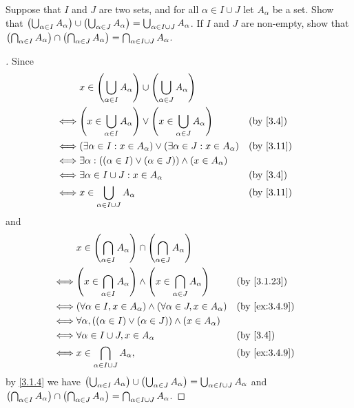 \begin{ex}\label{ex:3.4.10}
  Suppose that \(I\) and \(J\) are two sets, and for all \(\alpha \in I \cup J\) let \(A_\alpha\) be a set.
  Show that \(\left\lparen\bigcup_{\alpha \in I} A_\alpha\right\rparen \cup \left\lparen\bigcup_{\alpha \in J} A_\alpha\right\rparen = \bigcup_{\alpha \in I \cup J} A_\alpha\).
  If \(I\) and \(J\) are non-empty, show that \(\left\lparen\bigcap_{\alpha \in I} A_\alpha\right\rparen \cap \left\lparen\bigcap_{\alpha \in J} A_\alpha\right\rparen = \bigcap_{\alpha \in I \cup J} A_\alpha\).
\end{ex}

\begin{proof}[]
  Since
  \begin{align*}
         & x \in \pa{\bigcup_{\alpha \in I} A_\alpha} \cup \pa{\bigcup_{\alpha \in J} A_\alpha}                      \\
    \iff & \pa{x \in \bigcup_{\alpha \in I} A_\alpha} \lor \pa{x \in \bigcup_{\alpha \in J} A_\alpha} &  & \by{3.4}  \\
    \iff & (\exists \alpha \in I : x \in A_\alpha) \lor (\exists \alpha \in J : x \in A_\alpha)       &  & \by{3.11} \\
    \iff & \exists \alpha : ((\alpha \in I) \lor (\alpha \in J)) \land (x \in A_\alpha)                              \\
    \iff & \exists \alpha \in I \cup J : x \in A_\alpha                                               &  & \by{3.4}  \\
    \iff & x \in \bigcup_{\alpha \in I \cup J} A_\alpha                                               &  & \by{3.11}
  \end{align*}
  and
  \begin{align*}
         & x \in \pa{\bigcap_{\alpha \in I} A_\alpha} \cap \pa{\bigcap_{\alpha \in J} A_\alpha}                           \\
    \iff & \pa{x \in \bigcap_{\alpha \in I} A_\alpha} \land \pa{x \in \bigcap_{\alpha \in J} A_\alpha} &  & \by{3.1.23}   \\
    \iff & (\forall \alpha \in I, x \in A_\alpha) \land (\forall \alpha \in J, x \in A_\alpha)         &  & \by{ex:3.4.9} \\
    \iff & \forall \alpha, ((\alpha \in I) \lor (\alpha \in J)) \land (x \in A_\alpha)                                    \\
    \iff & \forall \alpha \in I \cup J, x \in A_\alpha                                                 &  & \by{3.4}      \\
    \iff & x \in \bigcap_{\alpha \in I \cup J} A_\alpha,                                               &  & \by{ex:3.4.9}
  \end{align*}
  by \cref{3.1.4} we have \(\left\lparen\bigcup_{\alpha \in I} A_\alpha\right\rparen \cup \left\lparen\bigcup_{\alpha \in J} A_\alpha\right\rparen = \bigcup_{\alpha \in I \cup J} A_\alpha\) and \(\left\lparen\bigcap_{\alpha \in I} A_\alpha\right\rparen \cap \left\lparen\bigcap_{\alpha \in J} A_\alpha\right\rparen = \bigcap_{\alpha \in I \cup J} A_\alpha\).
\end{proof}

